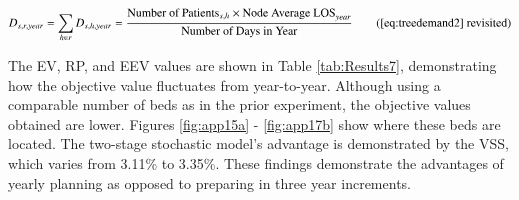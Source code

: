 \documentclass[../thesis.tex]{subfiles}
\begin{document}
\begin{equation}
        D_{s,r,year} = \sum\limits_{h \in r} D_{s,h,year} = \frac{\text{Number of Patients}_{s,h} \times {\text{Node Average LOS}}_{year}}{\text{Number of Days in Year}} \tag{\ref{eq:treedemand2} revisited}
\end{equation}

The EV, RP, and EEV values are shown in Table \ref{tab:Results7}, demonstrating how the objective value fluctuates from year-to-year. Although using a comparable number of beds as in the prior experiment, the objective values obtained are lower. Figures \ref{fig:app15a} - \ref{fig:app17b} show where these beds are located. The two-stage stochastic model's advantage is demonstrated by the VSS, which varies from 3.11\% to 3.35\%. These findings demonstrate the advantages of yearly planning as opposed to preparing in three year increments.

\begin{table}[h!]
    \centering{}
    \caption{The EV, RP and EEV values for the $x^\textnormal{bed}$, $u^\textnormal{bed}$, $x^\textnormal{staff}$, $u^\textnormal{staff}$ decision
variables and objective function using the classification tree and the yearly average LOS.}
    \label{tab:Results7}
\end{table}
\end{document}

